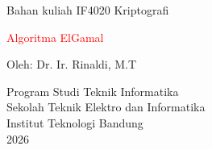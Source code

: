 \documentclass{article}
\begin{document}

\begin{center}
Bahan kuliah IF4020 Kriptografi

{\huge \textcolor{red}{Algoritma ElGamal}}

\vspace{30mm}

Oleh: Dr. Ir. Rinaldi, M.T

\vspace{10mm}

Program Studi Teknik Informatika\\
Sekolah Teknik Elektro dan Informatika\\
Institut Teknologi Bandung\\
2026
\end{center}
\end{document}
